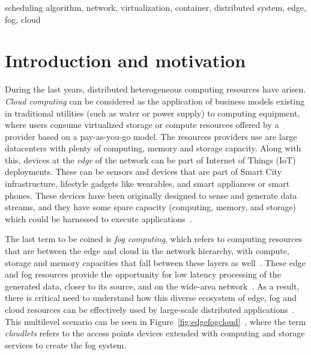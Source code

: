 \documentclass[conference]{IEEEtran}
\begin{document}
\begin{IEEEkeywords}
scheduling algorithm, network, virtualization, container, distributed system, edge, fog, cloud 
\end{IEEEkeywords}



\section{Introduction and motivation}

During the last years, distributed heterogeneous computing resources have arisen. \emph{Cloud computing} can be considered as the application of business models existing in traditional utilities (such as water or power supply) to computing equipment, where users consume virtualized storage or compute resources offered by a provider based on a pay-as-you-go model. The resources providers use are large datacenters with plenty of computing, memory and storage capacity. Along with this, devices at the \emph{edge} of the network can be  part of Internet of Things (IoT) deployments.  These can be sensors and devices that are part of Smart City infrastructure, lifestyle gadgets like wearables, and smart appliances or smart phones. These devices have been originally designed to sense and generate data streams, and they have some spare capacity (computing, memory, and storage) which could be harnessed to execute applications~\cite{GhoshKS18}. 

The last term to be coined is \emph{fog computing}, which refers to computing resources that are between the edge and cloud in the network hierarchy, with compute, storage and memory capacities that fall between these layers as well~\cite{Simmhan19}. These edge and fog resources provide the opportunity for low latency processing of the generated data, closer to its source, and on the wide-area network~\cite{Stojmenovic2014}. As a result, there is critical need to understand how this diverse ecosystem of edge, fog and cloud resources can be effectively used by large-scale distributed applications~\cite{Varshney2019}. This multilevel scenario can be seen in Figure~\ref{fig:edgefogcloud}~\cite{BittencourtMBRP17}, where the term \emph{cloudlets}  refers to the access points devices extended with computing and storage services to create the fog system.
 
\end{document}

